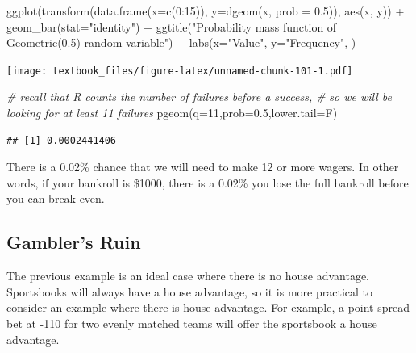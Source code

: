 \documentclass[
  11pt,
]{book}
\newenvironment{Shaded}{\begin{snugshade}}{\end{snugshade}}
\newcommand{\AttributeTok}[1]{\textcolor[rgb]{0.77,0.63,0.00}{#1}}
\newcommand{\CommentTok}[1]{\textcolor[rgb]{0.56,0.35,0.01}{\textit{#1}}}
\newcommand{\DecValTok}[1]{\textcolor[rgb]{0.00,0.00,0.81}{#1}}
\newcommand{\FloatTok}[1]{\textcolor[rgb]{0.00,0.00,0.81}{#1}}
\newcommand{\FunctionTok}[1]{\textcolor[rgb]{0.00,0.00,0.00}{#1}}
\newcommand{\NormalTok}[1]{#1}
\newcommand{\SpecialCharTok}[1]{\textcolor[rgb]{0.00,0.00,0.00}{#1}}
\newcommand{\StringTok}[1]{\textcolor[rgb]{0.31,0.60,0.02}{#1}}
\theoremstyle{definition}
\theoremstyle{definition}
\theoremstyle{definition}
\theoremstyle{definition}
\theoremstyle{remark}
\begin{document}
\begin{Shaded}
\begin{Highlighting}[]
\FunctionTok{ggplot}\NormalTok{(}\FunctionTok{transform}\NormalTok{(}\FunctionTok{data.frame}\NormalTok{(}\AttributeTok{x=}\FunctionTok{c}\NormalTok{(}\DecValTok{0}\SpecialCharTok{:}\DecValTok{15}\NormalTok{)), }\AttributeTok{y=}\FunctionTok{dgeom}\NormalTok{(x, }\AttributeTok{prob =} \FloatTok{0.5}\NormalTok{)), }\FunctionTok{aes}\NormalTok{(x, y)) }\SpecialCharTok{+} 
  \FunctionTok{geom\_bar}\NormalTok{(}\AttributeTok{stat=}\StringTok{"identity"}\NormalTok{) }\SpecialCharTok{+}
  \FunctionTok{ggtitle}\NormalTok{(}\StringTok{"Probability mass function of Geometric(0.5) random variable"}\NormalTok{) }\SpecialCharTok{+}
  \FunctionTok{labs}\NormalTok{(}\AttributeTok{x=}\StringTok{"Value"}\NormalTok{, }\AttributeTok{y=}\StringTok{"Frequency"}\NormalTok{, )}
\end{Highlighting}
\end{Shaded}

\texttt{[image: textbook\_files/figure-latex/unnamed-chunk-101-1.pdf]}

\begin{Shaded}
\begin{Highlighting}[]
\CommentTok{\# recall that R counts the number of failures before a success, }
\CommentTok{\# so we will be looking for at least 11 failures}
\FunctionTok{pgeom}\NormalTok{(}\AttributeTok{q=}\DecValTok{11}\NormalTok{,}\AttributeTok{prob=}\FloatTok{0.5}\NormalTok{,}\AttributeTok{lower.tail=}\NormalTok{F)}
\end{Highlighting}
\end{Shaded}

\begin{verbatim}
## [1] 0.0002441406
\end{verbatim}

There is a 0.02\% chance that we will need to make 12 or more wagers. In other words, if your bankroll is \$1000, there is a 0.02\% you lose the full bankroll before you can break even.

\newpage

\hypertarget{gamblers-ruin}{%
\subsection{Gambler's Ruin}\label{gamblers-ruin}}

The previous example is an ideal case where there is no house advantage. Sportsbooks will always have a house advantage, so it is more practical to consider an example where there is house advantage. For example, a point spread bet at -110 for two evenly matched teams will offer the sportsbook a house advantage.
\end{document}
